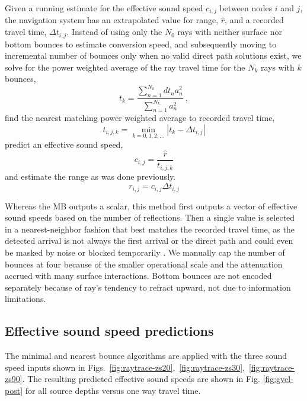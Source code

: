 Given a running estimate for the effective sound speed $c_{i,j}$ between nodes $i$ and $j$, the navigation system has an extrapolated value for range, $\hat{r}$, and a recorded travel time, $\Delta t_{i,j}$.
Instead of using only the $N_0$ rays with neither surface nor bottom bounces to estimate conversion speed, and subsequently moving to incremental number of bounces only when no valid direct path solutions exist, we solve for the power weighted average of the ray travel time for the $N_k$ rays with $k$ bounces,
\begin{equation}
t_k = \frac{\sum_{n=1}^{N_{k}} dt_{n}a_{n}^{2}}{\sum_{n=1}^{N_{k}} a_{n}^{2}} ~, 
\end{equation}
find the nearest matching power weighted average to recorded travel time,
\begin{equation}
t_{i,j,k} = \min_{k=0,1,2,...} \left| t_k - \Delta t_{i,j} \right|
\end{equation}
predict an effective sound speed,
\begin{equation}
c_{i,j} = \dfrac{\hat{r}}{t_{i,j,k}}
\end{equation}
and estimate the range as was done previously.
\begin{equation}
r_{i,j} = c_{i,j}\Delta t_{i,j}
\end{equation}

Whereas the MB outputs a scalar, this method first outputs a vector of effective sound speeds based on the number of reflections.
Then a single value is selected in a nearest-neighbor fashion that best matches the recorded travel time, as the detected arrival is not always the first arrival or the direct path and could even be masked by noise or blocked temporarily \citep{deffenbaugh_acoustic_1996}.
We manually cap the number of bounces at four because of the smaller operational scale and the attenuation accrued with many surface interactions.
Bottom bounces are not encoded separately because of ray's tendency to refract upward, not due to information limitations.

\subsection{Effective sound speed predictions}

The minimal and nearest bounce algorithms are applied with the three sound speed inputs shown in Figs.~\ref{fig:raytrace-zs20},~\ref{fig:raytrace-zs30},~\ref{fig:raytrace-zs90}.
The resulting predicted effective sound speeds are shown in Fig. \ref{fig:gvel-post} for all source depths versus one way travel time.

